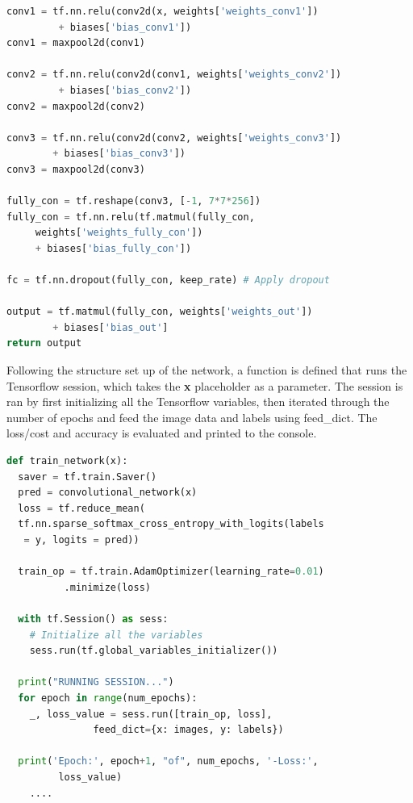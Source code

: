\begin{lstlisting}[language=python, frame=single]
conv1 = tf.nn.relu(conv2d(x, weights['weights_conv1'])
		 + biases['bias_conv1'])
conv1 = maxpool2d(conv1)

conv2 = tf.nn.relu(conv2d(conv1, weights['weights_conv2'])
		 + biases['bias_conv2'])
conv2 = maxpool2d(conv2)

conv3 = tf.nn.relu(conv2d(conv2, weights['weights_conv3']) 
		+ biases['bias_conv3'])
conv3 = maxpool2d(conv3)

fully_con = tf.reshape(conv3, [-1, 7*7*256])
fully_con = tf.nn.relu(tf.matmul(fully_con,
	 weights['weights_fully_con'])
 	 + biases['bias_fully_con'])
 
fc = tf.nn.dropout(fully_con, keep_rate) # Apply dropout

output = tf.matmul(fully_con, weights['weights_out']) 
		+ biases['bias_out']
return output
\end{lstlisting}

Following the structure set up of the network, a function is defined that runs the Tensorflow session, which takes the \textbf{x} placeholder as a parameter. The session is ran by first initializing all the Tensorflow variables, then iterated through
the number of epochs and feed the image data and labels using feed\_dict.
The loss/cost and accuracy is evaluated and printed to the console.\\

\begin{lstlisting}[language=python, frame=single]
def train_network(x):
  saver = tf.train.Saver()
  pred = convolutional_network(x)
  loss = tf.reduce_mean(
  tf.nn.sparse_softmax_cross_entropy_with_logits(labels
   = y, logits = pred))
 
  train_op = tf.train.AdamOptimizer(learning_rate=0.01)
          .minimize(loss)

  with tf.Session() as sess:
	# Initialize all the variables
	sess.run(tf.global_variables_initializer())

  print("RUNNING SESSION...")
  for epoch in range(num_epochs):
    _, loss_value = sess.run([train_op, loss], 
               feed_dict={x: images, y: labels})
                   
  print('Epoch:', epoch+1, "of", num_epochs, '-Loss:',
  		 loss_value)
  	....
\end{lstlisting}


